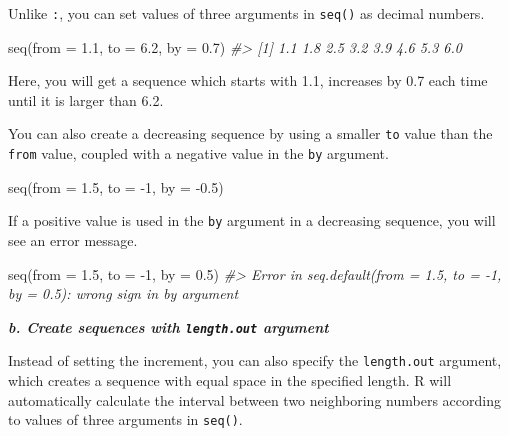 \documentclass[
]{book}
\newenvironment{Shaded}{\begin{snugshade}}{\end{snugshade}}
\newcommand{\AttributeTok}[1]{\textcolor[rgb]{0.77,0.63,0.00}{#1}}
\newcommand{\CommentTok}[1]{\textcolor[rgb]{0.56,0.35,0.01}{\textit{#1}}}
\newcommand{\DecValTok}[1]{\textcolor[rgb]{0.00,0.00,0.81}{#1}}
\newcommand{\FloatTok}[1]{\textcolor[rgb]{0.00,0.00,0.81}{#1}}
\newcommand{\FunctionTok}[1]{\textcolor[rgb]{0.00,0.00,0.00}{#1}}
\newcommand{\NormalTok}[1]{#1}
\newcommand{\SpecialCharTok}[1]{\textcolor[rgb]{0.00,0.00,0.00}{#1}}
\begin{document}
Unlike \texttt{:}, you can set values of three arguments in \texttt{seq()} as decimal numbers.

\begin{Shaded}
\begin{Highlighting}[]
\FunctionTok{seq}\NormalTok{(}\AttributeTok{from =} \FloatTok{1.1}\NormalTok{, }\AttributeTok{to =} \FloatTok{6.2}\NormalTok{, }\AttributeTok{by =} \FloatTok{0.7}\NormalTok{) }
\CommentTok{\#\textgreater{} [1] 1.1 1.8 2.5 3.2 3.9 4.6 5.3 6.0}
\end{Highlighting}
\end{Shaded}

Here, you will get a sequence which starts with 1.1, increases by 0.7 each time until it is larger than 6.2.

You can also create a decreasing sequence by using a smaller \texttt{to} value than the \texttt{from} value, coupled with a negative value in the \texttt{by} argument.

\begin{Shaded}
\begin{Highlighting}[]
\FunctionTok{seq}\NormalTok{(}\AttributeTok{from =} \FloatTok{1.5}\NormalTok{, }\AttributeTok{to =} \SpecialCharTok{{-}}\DecValTok{1}\NormalTok{, }\AttributeTok{by =} \SpecialCharTok{{-}}\FloatTok{0.5}\NormalTok{) }
\end{Highlighting}
\end{Shaded}

If a positive value is used in the \texttt{by} argument in a decreasing sequence, you will see an error message.

\begin{Shaded}
\begin{Highlighting}[]
\FunctionTok{seq}\NormalTok{(}\AttributeTok{from =} \FloatTok{1.5}\NormalTok{, }\AttributeTok{to =} \SpecialCharTok{{-}}\DecValTok{1}\NormalTok{, }\AttributeTok{by =} \FloatTok{0.5}\NormalTok{) }
\CommentTok{\#\textgreater{} Error in seq.default(from = 1.5, to = {-}1, by = 0.5): wrong sign in \textquotesingle{}by\textquotesingle{} argument}
\end{Highlighting}
\end{Shaded}

\textbf{\emph{b. Create sequences with \texttt{length.out} argument}}

Instead of setting the increment, you can also specify the \texttt{length.out} argument, which creates a sequence with equal space in the specified length. R will automatically calculate the interval between two neighboring numbers according to values of three arguments in \texttt{seq()}.
\end{document}
